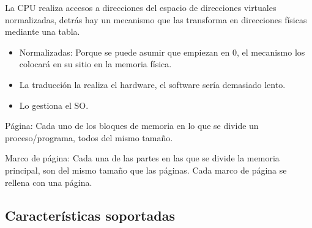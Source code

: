 \documentclass[12pt, twoside, openright]{report} %
\begin{document}
  La CPU realiza accesos a direcciones del espacio de direcciones
  virtuales normalizadas, detrás hay un mecanismo que las transforma
  en direcciones físicas mediante una tabla.

  \begin{itemize}    
  \item
    Normalizadas: Porque se puede asumir que empiezan en 0, el mecanismo
    los colocará en su sitio en la memoria física.
    
    \item
      La traducción la realiza el hardware, el software sería demasiado
      lento.
    \item
      Lo gestiona el SO.
  \end{itemize}

  Página: Cada uno de los bloques de memoria en lo que se divide un
    proceso/programa, todos del mismo tamaño.

    Marco de página: Cada una de las partes en las que se divide la
    memoria principal, son del mismo tamaño que las páginas. Cada marco
    de página se rellena con una página.

    \subsection{Características soportadas}
\end{document}
